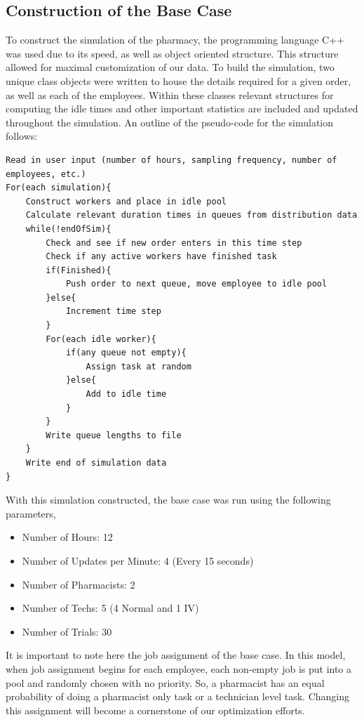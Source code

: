 \documentclass[10pt]{report}            %
\begin{document}
\subsection*{Construction of the Base Case}
To construct the simulation of the pharmacy, the programming language C++ was used due to its speed, as well as object oriented structure. This structure allowed for maximal customization of our data. To build the simulation, two unique class objects were written to house the details required for a given order, as well as each of the employees. Within these classes relevant structures for computing the idle times and other important statistics are included and updated throughout the simulation. An outline of the pseudo-code for the simulation follows:
\begin{verbatim}
Read in user input (number of hours, sampling frequency, number of employees, etc.)
For(each simulation){
    Construct workers and place in idle pool
    Calculate relevant duration times in queues from distribution data
    while(!endOfSim){
        Check and see if new order enters in this time step
        Check if any active workers have finished task
        if(Finished){
            Push order to next queue, move employee to idle pool
        }else{
            Increment time step
        }
        For(each idle worker){
            if(any queue not empty){
                Assign task at random                   
            }else{
                Add to idle time
            }
        }
        Write queue lengths to file
    }
    Write end of simulation data
}
\end{verbatim}
With this simulation constructed, the base case was run using the following parameters,
\begin{itemize}
\item Number of Hours: 12
\item Number of Updates per Minute: 4 (Every 15 seconds)
\item Number of Pharmacists: 2
\item Number of Techs: 5 (4 Normal and 1 IV)
\item Number of Trials: 30
\end{itemize}
It is important to note here the job assignment of the base case. In this model, when job assignment begins for each employee, each non-empty job is put into a pool and randomly chosen with no priority. So, a pharmacist has an equal probability of doing a pharmacist only task or a technician level task. Changing this assignment will become a cornerstone of our optimization efforts.
\end{document}
